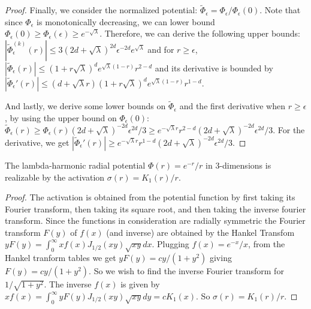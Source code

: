 \begin{proof}
Finally, we consider the normalized potential: $\widetilde{\Phi}_\epsilon = {\Phi}_\epsilon/{\Phi}_\epsilon(0)$. Note that since ${\Phi}_\epsilon$ is monotonically decreasing, we can lower bound ${\Phi}_\epsilon(0) \geq {\Phi}_\epsilon(\epsilon) \geq e^{-\sqrt{\lambda}}$. Therefore, we can derive the following upper bounds: $|\widetilde{\Phi}_\epsilon^{(k)}(r)| \leq 3(2d + \sqrt{\lambda})^{2d} \epsilon^{-2d}e^{\sqrt{\lambda}}$ and for $r \geq \epsilon$, $|\widetilde{\Phi}_\epsilon(r)| \leq (1+r\sqrt{\lambda})^de^{\sqrt{\lambda}(1-r)}r^{2-d}$ and its derivative is bounded by $|\widetilde{\Phi}_\epsilon'(r)| \leq (d+\sqrt{\lambda}r)(1+ r\sqrt{\lambda})^de^{\sqrt{\lambda}(1- r)} r^{1-d}$.


And lastly, we derive some lower bounds on $\widetilde{\Phi}_\epsilon$ and the first derivative when $r \geq \epsilon$, by using the upper bound on $\Phi_\epsilon(0)$: $\widetilde{\Phi}_\epsilon(r) \geq {\Phi}_\epsilon(r)(2d+\sqrt{\lambda})^{-2d}\epsilon^{2d}/3  \geq e^{-\sqrt{\lambda}r}r^{2-d}(2d+\sqrt{\lambda})^{-2d}\epsilon^{2d}/3$. For the derivative, we get
 $|\widetilde{\Phi}_\epsilon'(r)| \geq e^{-\sqrt{\lambda}r}r^{1-d}(2d+\sqrt{\lambda})^{-2d}\epsilon^{2d}/3$.
\end{proof}


\begin{lemma}\label{3dlambdaharmonic}
The lambda-harmonic radial potential $\Phi(r) = e^{-r}/r$ in $3$-dimensions is realizable by the activation 
$\sigma(r) = K_1(r)/r$.
\end{lemma}

\begin{proof}
The activation is obtained from the potential function by first taking its Fourier transform, then taking its square root, and then taking the inverse fourier transform. Since the functions in consideration are radially symmetric the Fourier transform $F(y)$ of $f(x)$ (and inverse) are obtained by the Hankel Transfom $y F(y) = \int_0^\infty x f(x) J_{1/2} (xy) \sqrt{xy} dx$. Plugging $f(x) = e^{-x}/x$, from the Hankel tranform tables we get $yF(y) = cy/(1+y^2)$ giving $F(y) = cy/(1+y^2)$. So we wish to find the inverse Fourier transform for $1/\sqrt{1+y^2}$. The inverse $f(x)$ is given by $xf(x) = \int_0^\infty y F(y) J_{1/2} (xy) \sqrt{xy} dy = cK_1(x)$. So $\sigma(r) = K_1(r)/r$.
\end{proof}

